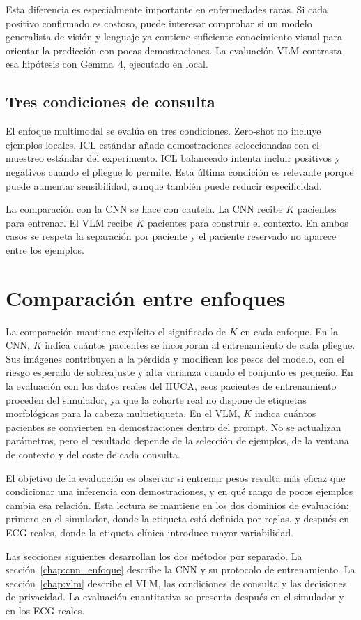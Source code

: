 Esta diferencia es especialmente importante en enfermedades raras. Si cada positivo confirmado es costoso, puede interesar comprobar si un modelo generalista de visión y lenguaje ya contiene suficiente conocimiento visual para orientar la predicción con pocas demostraciones. La evaluación VLM contrasta esa hipótesis con Gemma~4, ejecutado en local.

\subsection{Tres condiciones de consulta}

El enfoque multimodal se evalúa en tres condiciones. Zero-shot no incluye ejemplos locales. ICL estándar añade demostraciones seleccionadas con el muestreo estándar del experimento. ICL balanceado intenta incluir positivos y negativos cuando el pliegue lo permite. Esta última condición es relevante porque puede aumentar sensibilidad, aunque también puede reducir especificidad.

La comparación con la CNN se hace con cautela. La CNN recibe \(K\) pacientes para entrenar. El VLM recibe \(K\) pacientes para construir el contexto. En ambos casos se respeta la separación por paciente y el paciente reservado no aparece entre los ejemplos.

\section{Comparación entre enfoques}
\label{sec:dos_formas_K}

La comparación mantiene explícito el significado de \(K\) en cada enfoque. En la CNN, \(K\) indica cuántos pacientes se incorporan al entrenamiento de cada pliegue. Sus imágenes contribuyen a la pérdida y modifican los pesos del modelo, con el riesgo esperado de sobreajuste y alta varianza cuando el conjunto es pequeño. En la evaluación con los datos reales del HUCA, esos pacientes de entrenamiento proceden del simulador, ya que la cohorte real no dispone de etiquetas morfológicas para la cabeza multietiqueta. En el VLM, \(K\) indica cuántos pacientes se convierten en demostraciones dentro del prompt. No se actualizan parámetros, pero el resultado depende de la selección de ejemplos, de la ventana de contexto y del coste de cada consulta.

El objetivo de la evaluación es observar si entrenar pesos resulta más eficaz que condicionar una inferencia con demostraciones, y en qué rango de pocos ejemplos cambia esa relación. Esta lectura se mantiene en los dos dominios de evaluación: primero en el simulador, donde la etiqueta está definida por reglas, y después en ECG reales, donde la etiqueta clínica introduce mayor variabilidad.

Las secciones siguientes desarrollan los dos métodos por separado. La sección~\ref{chap:cnn_enfoque} describe la CNN y su protocolo de entrenamiento. La sección~\ref{chap:vlm} describe el VLM, las condiciones de consulta y las decisiones de privacidad. La evaluación cuantitativa se presenta después en el simulador y en los ECG reales.



